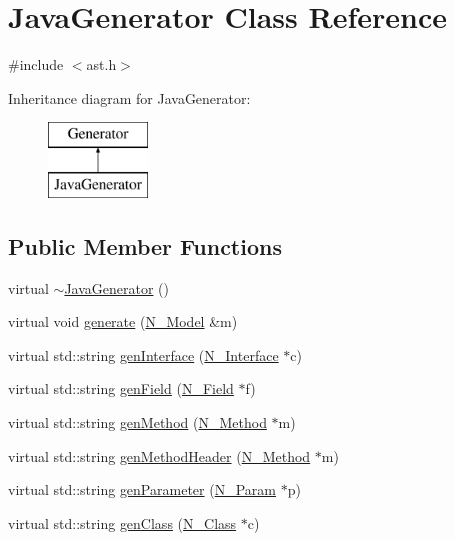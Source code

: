 \hypertarget{classJavaGenerator}{}\section{Java\+Generator Class Reference}
\label{classJavaGenerator}


{\ttfamily \#include $<$ast.\+h$>$}

Inheritance diagram for Java\+Generator\+:\begin{figure}[H]
\begin{center}
\leavevmode
\includegraphics[height=2.000000cm]{classJavaGenerator}
\end{center}
\end{figure}
\subsection*{Public Member Functions}
\begin{DoxyCompactItemize}
\item 
virtual \hyperlink{classJavaGenerator_abe76750a970b9dcdd25c6c9192df835e}{$\sim$\+Java\+Generator} ()
\item 
virtual void \hyperlink{classJavaGenerator_a9a920fcd472a9afd7eb44fb5f76d60af}{generate} (\hyperlink{classN__Model}{N\+\_\+\+Model} \&m)
\item 
virtual std\+::string \hyperlink{classJavaGenerator_a08be7bd01581127d1d6b7f1ca388aa8c}{gen\+Interface} (\hyperlink{classN__Interface}{N\+\_\+\+Interface} $\ast$c)
\item 
virtual std\+::string \hyperlink{classJavaGenerator_ac86377f3b08c88d53ee1669c8b623f8e}{gen\+Field} (\hyperlink{classN__Field}{N\+\_\+\+Field} $\ast$f)
\item 
virtual std\+::string \hyperlink{classJavaGenerator_af49a575754a670af62b8c38a87c62383}{gen\+Method} (\hyperlink{classN__Method}{N\+\_\+\+Method} $\ast$m)
\item 
virtual std\+::string \hyperlink{classJavaGenerator_af69f42b427c011da412d987ca5b87bd5}{gen\+Method\+Header} (\hyperlink{classN__Method}{N\+\_\+\+Method} $\ast$m)
\item 
virtual std\+::string \hyperlink{classJavaGenerator_a3431b1f8d251ab7a5a45ee3e809213ff}{gen\+Parameter} (\hyperlink{classN__Param}{N\+\_\+\+Param} $\ast$p)
\item 
virtual std\+::string \hyperlink{classJavaGenerator_afe0fee40e5af2729afaae8b392c7e0db}{gen\+Class} (\hyperlink{classN__Class}{N\+\_\+\+Class} $\ast$c)
\end{DoxyCompactItemize}
